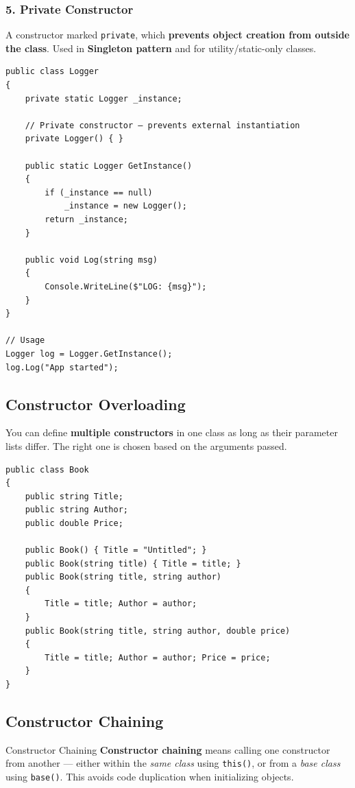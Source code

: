\documentclass[11pt,a4paper]{article}
\begin{document}
\subsubsection{5. Private Constructor}

A constructor marked \texttt{private}, which \textbf{prevents object creation from outside the class}. Used in \textbf{Singleton pattern} and for utility/static-only classes.

\begin{lstlisting}[caption={Private constructor (Singleton example)}]
public class Logger
{
    private static Logger _instance;

    // Private constructor — prevents external instantiation
    private Logger() { }

    public static Logger GetInstance()
    {
        if (_instance == null)
            _instance = new Logger();
        return _instance;
    }

    public void Log(string msg)
    {
        Console.WriteLine($"LOG: {msg}");
    }
}

// Usage
Logger log = Logger.GetInstance();
log.Log("App started");
\end{lstlisting}

\subsection{Constructor Overloading}

You can define \textbf{multiple constructors} in one class as long as their parameter lists differ. The right one is chosen based on the arguments passed.

\begin{lstlisting}[caption={Constructor overloading}]
public class Book
{
    public string Title;
    public string Author;
    public double Price;

    public Book() { Title = "Untitled"; }
    public Book(string title) { Title = title; }
    public Book(string title, string author)
    {
        Title = title; Author = author;
    }
    public Book(string title, string author, double price)
    {
        Title = title; Author = author; Price = price;
    }
}
\end{lstlisting}

\subsection{Constructor Chaining}

\begin{defnBox}{Constructor Chaining}
\textbf{Constructor chaining} means calling one constructor from another — either within the \textit{same class} using \texttt{this()}, or from a \textit{base class} using \texttt{base()}. This avoids code duplication when initializing objects.
\end{defnBox}
\end{document}
